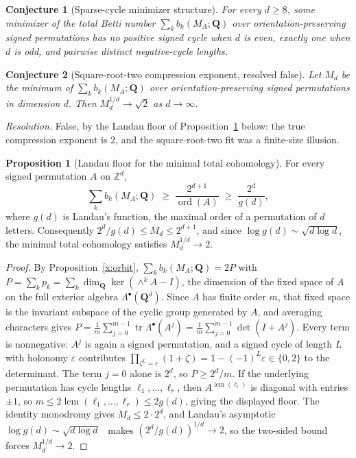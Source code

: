 \documentclass[11pt]{article}
\newtheorem{conjecture}{Conjecture}
\theoremstyle{definition}
\newcommand{\Z}{\mathbb Z}
\providecommand{\Z}{\mathbb Z}
\newtheorem{proposition}{Proposition}
\begin{document}
\begin{conjecture}[Sparse-cycle minimizer structure]\label{x18}
For every $d\ge8$, some minimizer of the total Betti number $\sum_kb_k(M_A;\mathbf Q)$ over orientation-preserving signed permutations has no positive signed cycle when $d$ is even, exactly one when $d$ is odd, and pairwise distinct negative-cycle lengths.
\end{conjecture}

\begin{conjecture}[Square-root-two compression exponent, resolved false]\label{x19}
Let $M_d$ be the minimum of $\sum_kb_k(M_A;\mathbf Q)$ over orientation-preserving signed permutations in dimension $d$.  Then $M_d^{1/d}\to\sqrt2$ as $d\to\infty$.
\end{conjecture}

\emph{Resolution.} False, by the Landau floor of Proposition~\ref{x:landau} below: the true compression exponent is $2$, and the square-root-two fit was a finite-size illusion.

\begin{proposition}[Landau floor for the minimal total cohomology]\label{x:landau}
For every signed permutation $A$ on $\Z^d$,
\[
\sum_kb_k(M_A;\mathbf Q)\;\ge\;\frac{2^{d+1}}{\operatorname{ord}(A)}\;\ge\;\frac{2^{d}}{g(d)},
\]
where $g(d)$ is Landau's function, the maximal order of a permutation of $d$ letters.  Consequently $2^d/g(d)\le M_d\le2^{d+1}$, and since $\log g(d)\sim\sqrt{d\log d}$, the minimal total cohomology satisfies $M_d^{1/d}\to2$.
\end{proposition}

\begin{proof}
By Proposition~\ref{x:orbit}, $\sum_kb_k(M_A;\mathbf Q)=2P$ with $P=\sum_kp_k=\sum_k\dim_{\mathbf Q}\ker(\wedge^kA-I)$, the dimension of the fixed space of $A$ on the full exterior algebra $\Lambda^\bullet(\mathbf Q^d)$.  Since $A$ has finite order $m$, that fixed space is the invariant subspace of the cyclic group generated by $A$, and averaging characters gives $P=\frac1m\sum_{j=0}^{m-1}\operatorname{tr}\Lambda^\bullet(A^j)=\frac1m\sum_{j=0}^{m-1}\det(I+A^j)$.  Every term is nonnegative: $A^j$ is again a signed permutation, and a signed cycle of length $L$ with holonomy $\varepsilon$ contributes $\prod_{\zeta^L=\varepsilon}(1+\zeta)=1-(-1)^L\varepsilon\in\{0,2\}$ to the determinant.  The term $j=0$ alone is $2^d$, so $P\ge2^d/m$.  If the underlying permutation has cycle lengths $\ell_1,\ldots,\ell_r$, then $A^{\operatorname{lcm}(\ell_i)}$ is diagonal with entries $\pm1$, so $m\le2\operatorname{lcm}(\ell_1,\ldots,\ell_r)\le2g(d)$, giving the displayed floor.  The identity monodromy gives $M_d\le2\cdot2^d$, and Landau's asymptotic $\log g(d)\sim\sqrt{d\log d}$~\cite{Lan03} makes $(2^d/g(d))^{1/d}\to2$, so the two-sided bound forces $M_d^{1/d}\to2$.
\end{proof}
\end{document}
